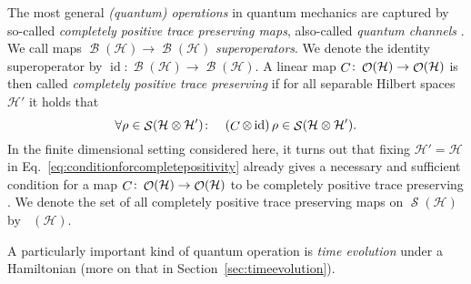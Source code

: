 \documentclass[a4paper,12pt,listof=totoc,index=totoc,bibliography=totoc,headsepline=false,headings=normal,BCOR16.153846mm,DIV12,headinclude,twoside,cleardoublepage=empty,numbers=noenddot,final]{scrreprt}
\theoremstyle{mystyle}
\numberwithin{equation}{section}
\numberwithin{figure}{section}
\numberwithin{lemma}{section}
\numberwithin{theorem}{section}
\numberwithin{corollary}{section}
\numberwithin{definition}{section}
\numberwithin{conjecture}{section}
\numberwithin{observation}{section}
\newcommand{\+}{\mkern2mu}
\newcommand{\texteqref}[1]{Eq.~\eqref{#1}}
\newcommand{\oftype}{\colon}
\newcommand{\itholds}{\colon\mathchoice{\quad}{}{}{}}
\DeclareMathOperator{\1}{\mathds{1}}
\DeclareMathOperator{\id}{\mathrm{id}}
\DeclareMathOperator{\Bop}{\mathcal{B}}
\DeclareMathOperator{\Obs}{\mathcal{O}}
\DeclareMathOperator{\Qst}{\mathcal{S}}
\DeclareMathOperator{\Qch}{\mathcal{T^+}}
\DeclareMathOperator{\Chann}{\mathnormal{C}}
\newcommand{\mc}[1]{\mathcal{#1}}
\newcommand{\mcH}{\mc{H}}
\begin{document}
The most general \emph{(quantum) operations} in quantum mechanics are captured by so-called \emph{completely positive trace preserving maps}, also-called \emph{quantum channels} \cite{nielsenchuang}.
We call maps $\Bop(\mcH)\to\Bop(\mcH)$ \emph{superoperators}.
We denote the identity superoperator by $\id\oftype\Bop(\mcH)\to\Bop(\mcH)$.
A linear map $\Chann\oftype\Obs(\mcH)\to\Obs(\mcH)$ is then called \emph{completely positive trace preserving} if for all separable Hilbert spaces $\mcH'$ it holds that 
\begin{equation} \label{eq:conditionforcompletepositivity}
  \forall \rho \in \Qst(\mcH \otimes \mcH')\itholds (\Chann \otimes \id)\,\rho \in \Qst(\mcH \otimes \mcH') .
\end{equation}
In the finite dimensional setting considered here, it turns out that fixing $\mcH' = \mcH$ in \texteqref{eq:conditionforcompletepositivity} already gives a necessary and sufficient condition for a map $\Chann\oftype\Obs(\mcH)\to\Obs(\mcH)$ to be completely positive trace preserving \cite{nielsenchuang}.
We denote the set of all completely positive trace preserving maps on $\Qst(\mcH)$ by $\Qch(\mcH)$.

A particularly important kind of quantum operation is \emph{time evolution} under a Hamiltonian (more on that in Section~\ref{sec:timeevolution}).
\end{document}
